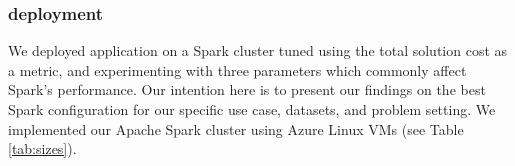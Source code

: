 {%
\subsubsection{\sparkdi{} deployment}
We deployed \sparkdi{} application on a Spark cluster tuned using the total solution cost as a metric, and experimenting with three parameters which commonly affect Spark's performance. Our intention here is to present our findings on the best Spark configuration for our specific use case, datasets, and problem setting. We implemented our Apache Spark cluster using Azure Linux VMs (see Table \ref{tab:sizes}).

\begin{figure}[t!]
   \\
\end{figure}}
